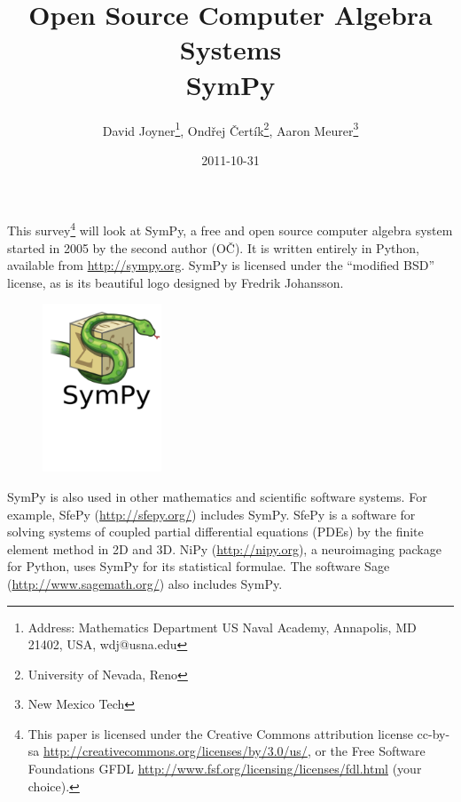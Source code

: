 \documentclass[12pt]{article}
\def\OC{OČ}
\def\AM{Aaron Meurer}
\begin{document}
\author{David Joyner\thanks{Address: Mathematics Department
US Naval Academy, Annapolis, MD 21402, USA, wdj@usna.edu},
Ondřej Čertík\thanks{University of Nevada, Reno},
\AM\thanks{New Mexico Tech}}
\title{{\small{Open Source Computer Algebra Systems}}\\ {\LARGE{SymPy}}}

\date{2011-10-31}

\maketitle




This survey\footnote{This paper is licensed under the
Creative Commons attribution license cc-by-sa
\url{http://creativecommons.org/licenses/by/3.0/us/},
or the Free Software Foundations GFDL
\url{http://www.fsf.org/licensing/licenses/fdl.html}
(your choice).}
will look at SymPy, a free and open source computer algebra
system started in 2005 by the second author (\OC).
It is written entirely in Python, available from
\url{http://sympy.org}.
SymPy is licensed under the ``modified BSD'' license, as is its
beautiful logo designed by Fredrik Johansson.

\begin{figure}[h!]
\begin{center}
\includegraphics[height=5cm]{sympy-snake-icon.pdf}
\end{center}
\end{figure}

\vskip-2cm

SymPy is also used in other mathematics and scientific software systems.
For example, SfePy (\url{http://sfepy.org/}) includes SymPy. SfePy is a
software for solving systems of coupled partial differential equations
(PDEs) by the finite element method in 2D and 3D.  NiPy
(\url{http://nipy.org}), a neuroimaging package for Python, uses SymPy
for its statistical formulae. The software Sage
(\url{http://www.sagemath.org/}) also includes SymPy.
\end{document}
